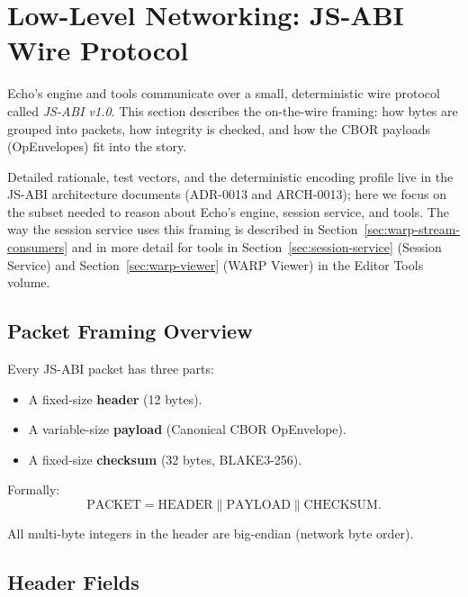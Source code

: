 \section{Low-Level Networking: JS-ABI Wire Protocol}
\label{sec:js-abi-wire}

Echo’s engine and tools communicate over a small, deterministic wire protocol
called \emph{JS-ABI v1.0}. This section describes the on-the-wire framing: how
bytes are grouped into packets, how integrity is checked, and how the CBOR
payloads (OpEnvelopes) fit into the story.

Detailed rationale, test vectors, and the deterministic encoding profile live
in the JS-ABI architecture documents (ADR-0013 and ARCH-0013); here we focus on
the subset needed to reason about Echo’s engine, session service, and tools.
The way the session service uses this framing is described in
Section~\ref{sec:warp-stream-consumers} and in more detail for tools in
Section~\ref{sec:session-service} (Session Service) and
Section~\ref{sec:warp-viewer} (WARP Viewer) in the Editor Tools volume.

\subsection{Packet Framing Overview}

Every JS-ABI packet has three parts:

\begin{itemize}
  \item A fixed-size \textbf{header} (12 bytes).
  \item A variable-size \textbf{payload} (Canonical CBOR OpEnvelope).
  \item A fixed-size \textbf{checksum} (32 bytes, BLAKE3-256).
\end{itemize}

Formally:
\[
  \mathrm{PACKET}
  = \mathrm{HEADER} \parallel \mathrm{PAYLOAD} \parallel \mathrm{CHECKSUM}.
\]

\noindent
All multi-byte integers in the header are big-endian (network byte order).

\subsection{Header Fields}

